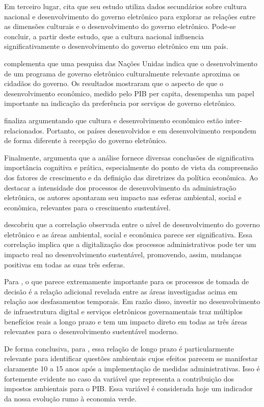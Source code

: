 Em terceiro lugar, \cite{kumar2020cultural} cita que seu estudo utiliza dados secundários sobre cultura nacional e desenvolvimento do governo eletrônico para explorar as relações entre as dimensões culturais e o desenvolvimento do governo eletrônico. Pode-se concluir, a partir deste estudo, que a cultura nacional influencia significativamente o desenvolvimento do governo eletrônico em um país.

\cite{kumar2020cultural} complementa que uma pesquisa das Nações Unidas indica que o desenvolvimento de um programa de governo eletrônico culturalmente relevante aproxima os cidadãos do governo. Os resultados mostraram que o aspecto de que o desenvolvimento econômico, medido pelo PIB per capita, desempenha um papel importante na indicação da preferência por serviços de governo eletrônico.

\cite{kumar2020cultural} finaliza argumentando que cultura e desenvolvimento econômico estão inter-relacionados. Portanto, os países desenvolvidos e em desenvolvimento respondem de forma diferente à recepção do governo eletrônico.

Finalmente, \cite{ziolo2022government} argumenta que a análise fornece diversas conclusões de significativa importância cognitiva e prática, especialmente do ponto de vista da compreensão dos fatores de crescimento e da definição das diretrizes da política econômica. Ao destacar a intensidade dos processos de desenvolvimento da administração eletrônica, os autores apontaram seu impacto nas esferas ambiental, social e econômica, relevantes para o crescimento sustentável.

\cite{ziolo2022government} descobriu que a correlação observada entre o nível de desenvolvimento do governo eletrônico e as áreas ambiental, social e econômica parece ser significativa. Essa correlação implica que a digitalização dos processos administrativos pode ter um impacto real no desenvolvimento sustentável,
promovendo, assim, mudanças positivas em todas as suas três esferas.

Para \cite{ziolo2022government}, o que parece extremamente importante para os processos de tomada de decisão é a relação adicional revelada entre as áreas investigadas acima em relação aos desfasamentos temporais. Em razão disso,  investir no desenvolvimento de infraestrutura digital e serviços eletrônicos governamentais traz múltiplos benefícios reais a longo prazo e tem um impacto direto em todas as três áreas relevantes para o desenvolvimento sustentável moderno.

De forma conclusiva, para \cite{ziolo2022government}, essa relação de longo prazo é particularmente relevante para identificar questões ambientais cujos efeitos parecem se manifestar claramente 10 a 15 anos após a implementação de medidas administrativas. Isso é fortemente evidente no caso da variável que representa a contribuição dos impostos ambientais para o PIB. Essa variável é considerada hoje um indicador da nossa evolução rumo à economia verde.

